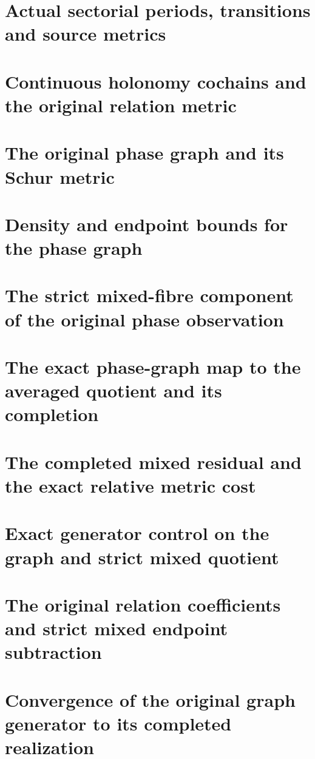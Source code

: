 \documentclass[11pt,a4paper,oneside,openany]{book}
\theoremstyle{definition}
\begin{document}
\chapter{Actual sectorial periods, transitions and source metrics}
\begingroup

\endgroup
\chapter{Continuous holonomy cochains and the original relation metric}
\begingroup

\endgroup
\chapter{The original phase graph and its Schur metric}
\begingroup

\endgroup
\chapter{Density and endpoint bounds for the phase graph}
\begingroup

\endgroup
\chapter{The strict mixed-fibre component of the original phase observation}
\begingroup

\endgroup
\chapter{The exact phase-graph map to the averaged quotient and its completion}
\begingroup

\endgroup
\chapter{The completed mixed residual and the exact relative metric cost}
\begingroup

\endgroup
\chapter{Exact generator control on the graph and strict mixed quotient}
\begingroup

\endgroup
\chapter{The original relation coefficients and strict mixed endpoint subtraction}
\begingroup

\endgroup
\chapter{Convergence of the original graph generator to its completed realization}
\begingroup

\endgroup
\end{document}
